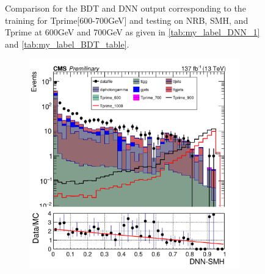 \begin{figure}[H]
\begin{subfigure}[b]{0.45\textwidth}
         \label{fig:three sin x}
     \end{subfigure}
     \label{fig:Comaprision_1}
     \caption{Comparison for the BDT and DNN output corresponding to the training for Tprime[600-700GeV] and testing on NRB, SMH, and Tprime at 600GeV and 700GeV as given in \autoref{tab:my_label_DNN_1} and \autoref{tab:my_label_BDT_table}.}
\end{figure}




\begin{figure}[H]
     \centering
     \begin{subfigure}[b]{0.47\textwidth}
         \centering
         \includegraphics[width=\textwidth]{figure_4/Stacked_plot_DNN_800-1000_with_diphoton_cuts.pdf}
         \label{fig:y equals x}
     \end{subfigure}
     \hfill
     \begin{subfigure}[b]{0.47\textwidth}
         \centering

\end{subfigure}
\end{figure}
